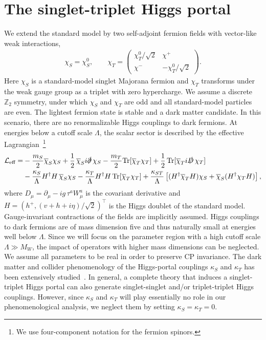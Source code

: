 \documentclass[nofootinbib,prd,aps,superscriptaddress,preprintnumbers]{revtex4}
\begin{document}
\section{The singlet-triplet Higgs portal}\label{sec:model}
\noindent
We extend the standard model by two self-adjoint fermion fields with vector-like weak interactions,
\begin{align}
\chi_S = \chi_S^0,\qquad \chi_T = \begin{pmatrix}
\chi_T^0/\sqrt{2} & \chi^+ \\ \chi^{-} & -\chi_T^0/\sqrt{2}\end{pmatrix}.
\end{align}
Here $\chi_S$ is a standard-model singlet Majorana fermion and $\chi_T$ transforms under the weak gauge group as a triplet with zero hypercharge. We assume a discrete $\mathbb{Z}_2$ symmetry, under which $\chi_S$ and $\chi_T$ are odd and all standard-model particles are even. The lightest fermion state is stable and a dark matter candidate. In this scenario, there are no renormalizable Higgs couplings to dark fermions. At energies below a cutoff scale $\Lambda$, the scalar sector is described by the effective Lagrangian~\footnote{We use four-component notation for the fermion spinors.}
\begin{align}\label{eq:lag}
\mathcal{L}_{\text{eff}} = & - \frac{m_S}{2} \overline{\chi}_S\chi_S + \frac{1}{2}\,\overline{\chi}_S i\slashed{\partial}\,\chi_S - \frac{m_T}{2} \text{Tr}[\overline{\chi}_T\chi_T] + \frac{1}{2}\,\text{Tr}[\overline{\chi}_T i \slashed{D}\,\chi_T]\\\nonumber
& - \frac{\kappa_S}{\Lambda}H^\dagger H\,\overline{\chi}_S\chi_S - \frac{\kappa_T}{\Lambda} H^\dagger H\,\text{Tr}[\overline{\chi}_T\chi_T] + \frac{\kappa_{ST}}{\Lambda}\left[(H^\dagger \overline{\chi}_T H)\chi_S +  \overline{\chi}_S (H^\dagger \chi_T H) \right],
\end{align}
where $D_\mu = \partial_\mu - i g\,\tau^a W_\mu^a$ is the covariant derivative and $H = (h^+,(v+h+i\eta)/\sqrt{2})^\top$ is the Higgs doublet of the standard model. Gauge-invariant contractions of the fields are implicitly assumed. Higgs couplings to dark fermions are of mass dimension five and thus naturally small at energies well below $\Lambda$. Since we will focus on the parameter region with a high cutoff scale $\Lambda \gg M_W$, the impact of operators with higher mass dimensions can be neglected. We assume all parameters to be real in order to preserve CP invariance. The dark matter and collider phenomenology of the Higgs-portal couplings $\kappa_S$ and $\kappa_T$ has been extensively studied~\cite{LopezHonorez:2012kv,Djouadi:2011aa,Cirelli:2014dsa,Baum:2017enm}. In general, a complete theory that induces a singlet-triplet Higgs portal can also generate singlet-singlet and/or triplet-triplet Higgs couplings. However, since $\kappa_S$ and $\kappa_T$ will play essentially no role in our phenomenological analysis, we neglect them by setting $\kappa_S = \kappa_T = 0$.\\
\end{document}

